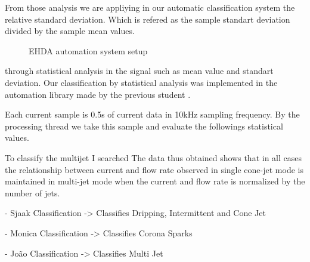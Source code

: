 From those analysis we are appliying in our automatic classification system the relative standard deviation. Which is refered as the sample standart deviation divided by the sample mean values.

\begin{figure}[H]
    \centering
    \caption{EHDA automation system setup}
    \label{fig:sjaaks_statistical_class}
\end{figure}

 
 through statistical analysis in the signal such as mean value and standart deviation.
 Our classification by statistical analysis was implemented in the automation library made by the previous student \cite{Monica}.

 Each current sample is 0.5s of current data in 10kHz sampling frequency.
 By the processing thread we take this sample and evaluate the followings statistical values.

To classify the multijet I searched \cite{Ryan} The data thus obtained shows that in all cases the relationship between current and flow rate observed in single cone-jet mode is maintained in multi-jet mode when the current and flow rate is normalized by the number of jets. 

        
        - Sjaak Classification -> Classifies Dripping, Intermittent and Cone Jet
        
        - Monica Classification -> Classifies Corona Sparks

        - João Classification -> Classifies Multi Jet

